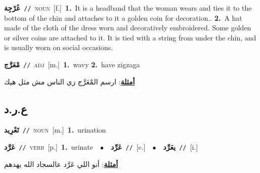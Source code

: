 \documentclass[10pt,a4paper,twoside]{article} %
\begin{document}
\begin{multicols}{2}
{\setlength\topsep{0pt}\textbf{\foreignlanguage{arabic}{عُرْجِة}}\ {\color{gray}\texttt{//}\color{black}}\ \textsc{noun}\ [f.]\ \textbf{1.}~It is a headband that the woman wears and ties it to the bottom of the chin and attaches to it a golden coin for decoration..  \textbf{2.}~A hat made of the cloth of the dress worn and decoratively embroidered. Some golden or silver coins are attached to it. It is tied with a string from under the chin, and is usually worn on social occasions.\ } \vspace{2mm}

{\setlength\topsep{0pt}\textbf{\foreignlanguage{arabic}{مْعَرَّج}}\ {\color{gray}\texttt{//}\color{black}}\ \textsc{adj}\ [m.]\ \textbf{1.}~wavy  \textbf{2.}~have zigzaga\  \begin{flushright}\color{gray}\foreignlanguage{arabic}{\textbf{\underline{\foreignlanguage{arabic}{أمثلة}}}: ارسم المْعَرَّج زي الناس مش مثل هيك}\end{flushright}\color{black}} \vspace{2mm}

\vspace{-3mm}
\subsection*{\color{blue}\foreignlanguage{arabic}{ع.ر.د}\color{blue}{}} 

{\setlength\topsep{0pt}\textbf{\foreignlanguage{arabic}{تَعْرِيد}}\ {\color{gray}\texttt{//}\color{black}}\ \textsc{noun}\ [m.]\ \textbf{1.}~urination\ } \vspace{2mm}

{\setlength\topsep{0pt}\textbf{\foreignlanguage{arabic}{عَرَّد}}\ {\color{gray}\texttt{//}\color{black}}\ \textsc{verb}\ [p.]\ \textbf{1.}~urinate\ \ $\bullet$\ \ \setlength\topsep{0pt}\textbf{\foreignlanguage{arabic}{عَرِّد}}\ {\color{gray}\texttt{//}\color{black}}\ [c.]\ \ $\bullet$\ \ \setlength\topsep{0pt}\textbf{\foreignlanguage{arabic}{يعَرِّد}}\ {\color{gray}\texttt{//}\color{black}}\ [i.]\  \begin{flushright}\color{gray}\foreignlanguage{arabic}{\textbf{\underline{\foreignlanguage{arabic}{أمثلة}}}: أنو اللي عَرَّد عالسجاد الله يهدهم}\end{flushright}\color{black}} \vspace{2mm}


\end{multicols}
\end{document}
